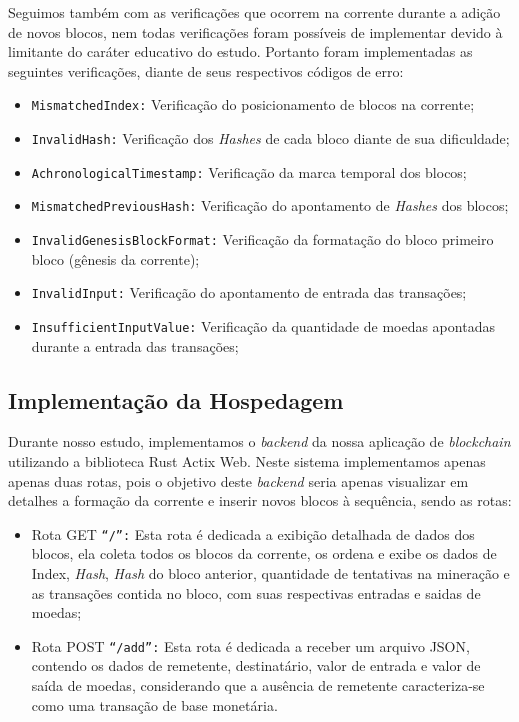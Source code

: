 \documentclass[article,12pt,oneside,a4paper,english,brazil]{unifil}
\begin{document}
\begin{Spacing}{1.5}
Seguimos também com as verificações que ocorrem na corrente durante a adição de novos blocos, nem todas verificações foram possíveis de implementar devido à limitante do caráter educativo do estudo. Portanto foram implementadas as seguintes verificações, diante de seus respectivos códigos de erro:

\begin{itemize}
    \item \texttt{MismatchedIndex:} Verificação do posicionamento de blocos na corrente;
    \item \texttt{InvalidHash:} Verificação dos \textit{Hashes} de cada bloco diante de sua dificuldade;
    \item \texttt{AchronologicalTimestamp:} Verificação da marca temporal dos blocos;
    \item \texttt{MismatchedPreviousHash:} Verificação do apontamento de \textit{Hashes} dos blocos;
    \item \texttt{InvalidGenesisBlockFormat:} Verificação da formatação do bloco primeiro bloco (gênesis da corrente);
    \item \texttt{InvalidInput:} Verificação do apontamento de entrada das transações;
    \item \texttt{InsufficientInputValue:} Verificação da quantidade de moedas apontadas durante a entrada das transações;

\end{itemize}

\subsection*{Implementação da Hospedagem}

Durante nosso estudo, implementamos o \textit{backend} da nossa aplicação de \textit{blockchain} utilizando a biblioteca Rust Actix Web. Neste sistema implementamos apenas apenas duas rotas, pois o objetivo deste \textit{backend} seria apenas visualizar em detalhes a formação da corrente e inserir novos blocos à sequência, sendo as rotas:

\begin{itemize}
\item Rota GET \texttt{``/'':} Esta rota é dedicada a exibição detalhada de dados dos blocos, ela coleta todos os blocos da corrente, os ordena e exibe os dados de Index, \textit{Hash}, \textit{Hash} do bloco anterior, quantidade de tentativas na mineração e as transações contida no bloco, com suas respectivas entradas e saidas de moedas;
\item Rota POST \texttt{``/add'':} Esta rota é dedicada a receber um arquivo JSON, contendo os dados de remetente, destinatário, valor de entrada e valor de saída de moedas, considerando que a ausência de remetente caracteriza-se como uma transação de base monetária.


\end{itemize}
\end{Spacing}
\end{document}

